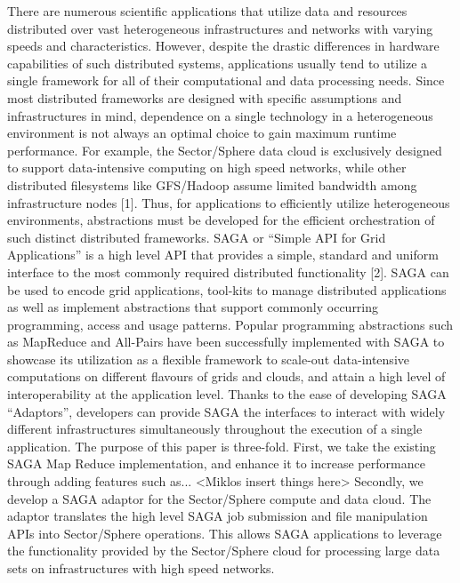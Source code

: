 \documentclass[a4paper,11pt]{article}
\begin{document}
There are numerous scientific applications that utilize data and resources distributed over vast heterogeneous infrastructures and networks with varying speeds and characteristics. However, despite the drastic differences in hardware capabilities of such distributed systems, applications usually tend to utilize a single framework for all of their computational and data processing needs. Since most distributed frameworks are designed with specific assumptions and infrastructures in mind, dependence on a single technology in a heterogeneous environment is not always an optimal choice to gain maximum runtime performance. For example, the Sector/Sphere data cloud is exclusively designed to support data-intensive computing on high speed networks, while other distributed filesystems like GFS/Hadoop assume limited bandwidth among infrastructure nodes [1]. Thus, for applications to efficiently utilize heterogeneous environments, abstractions must be developed for the efficient orchestration of such distinct distributed frameworks. 
SAGA or “Simple API for Grid Applications” is a high level API that provides a simple, standard and uniform interface to the most commonly required distributed functionality [2]. SAGA can be used to encode grid applications, tool-kits to manage distributed applications as well as implement abstractions that support commonly occurring programming, access and usage patterns. Popular programming abstractions such as MapReduce and All-Pairs have been successfully implemented with SAGA to showcase its utilization as a flexible framework to scale-out data-intensive computations on different flavours of grids and clouds, and attain a high level of interoperability at the application level. Thanks to the ease of developing SAGA “Adaptors”, developers can provide SAGA the interfaces to interact with widely different infrastructures simultaneously throughout the execution of a single application. 
The purpose of this paper is three-fold. First, we take the existing SAGA Map Reduce implementation, and enhance it to increase performance through adding features such as... <Miklos insert things here>
Secondly, we develop a SAGA adaptor for the Sector/Sphere compute and data cloud. The adaptor translates the high level SAGA job submission and file manipulation APIs into Sector/Sphere operations. This allows SAGA applications to leverage the functionality provided by the Sector/Sphere cloud for processing large data sets on infrastructures with high speed networks. 
\end{document}
